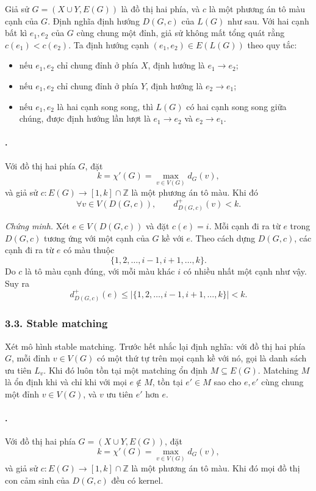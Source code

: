 \documentclass[11pt]{article}
\begin{document}
Giả sử \(G=(X\cup Y,E(G))\) là đồ thị hai phía, và \(c\) là một phương án tô
màu cạnh của \(G\). Định nghĩa định hướng \(D(G,c)\) của \(L(G)\) như sau. Với
hai cạnh bất kì \(e_1,e_2\) của \(G\) cùng chung một đỉnh, giả sử không mất
tổng quát rằng \(c(e_1)<c(e_2)\). Ta định hướng cạnh \((e_1,e_2)\in E(L(G))\)
theo quy tắc:
\begin{itemize}
\item nếu \(e_1,e_2\) chỉ chung đỉnh ở phía \(X\), định hướng là \(e_1\to e_2\);
\item nếu \(e_1,e_2\) chỉ chung đỉnh ở phía \(Y\), định hướng là \(e_2\to e_1\);
\item nếu \(e_1,e_2\) là hai cạnh song song, thì \(L(G)\) có hai cạnh song song
giữa chúng, được định hướng lần lượt là \(e_1\to e_2\) và \(e_2\to e_1\).
\end{itemize}

\paragraph{.}
Với đồ thị hai phía \(G\), đặt
\[
  k=\chi'(G)=\max_{v\in V(G)} d_G(v),
\]
và giả sử \(c:E(G)\to [1,k]\cap\mathbb Z\) là một phương án tô màu. Khi đó
\[
  \forall v\in V(D(G,c)),\qquad d_{D(G,c)}^+(v)<k.
\]

\emph{Chứng minh.}
Xét \(e\in V(D(G,c))\) và đặt \(c(e)=i\). Mỗi cạnh đi ra từ \(e\) trong
\(D(G,c)\) tương ứng với một cạnh của \(G\) kề với \(e\). Theo cách dựng
\(D(G,c)\), các cạnh đi ra từ \(e\) có màu thuộc
\[
  \{1,2,\ldots,i-1,i+1,\ldots,k\}.
\]
Do \(c\) là tô màu cạnh đúng, với mỗi màu khác \(i\) có nhiều nhất một cạnh như
vậy. Suy ra
\[
  d_{D(G,c)}^+(e)\le |\{1,2,\ldots,i-1,i+1,\ldots,k\}|<k.
\]

\subsubsection*{3.3. Stable matching}

Xét mô hình stable matching. Trước hết nhắc lại định nghĩa: với đồ thị hai phía
\(G\), mỗi đỉnh \(v\in V(G)\) có một thứ tự trên mọi cạnh kề với nó, gọi là
danh sách ưu tiên \(L_v\). Khi đó luôn tồn tại một matching ổn định
\(M\subseteq E(G)\). Matching \(M\) là ổn định khi và chỉ khi với mọi
\(e\notin M\), tồn tại \(e'\in M\) sao cho \(e,e'\) cùng chung một đỉnh
\(v\in V(G)\), và \(v\) ưu tiên \(e'\) hơn \(e\).

\paragraph{.}
Với đồ thị hai phía \(G=(X\cup Y,E(G))\), đặt
\[
  k=\chi'(G)=\max_{v\in V(G)}d_G(v),
\]
và giả sử \(c:E(G)\to[1,k]\cap\mathbb Z\) là một phương án tô màu. Khi đó mọi
đồ thị con cảm sinh của \(D(G,c)\) đều có kernel.
\end{document}
